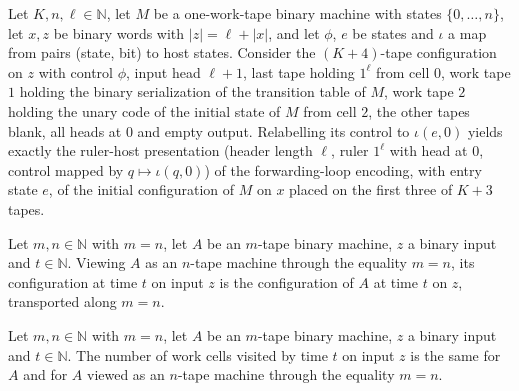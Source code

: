 \begin{theorem}
\label{Complexity.f6_last_ruler_layout}
\leanok
{}
Let $K,n,\ell\in\mathbb{N}$, let $M$ be a one-work-tape binary machine with states
$\{0,\dots,n\}$, let $x,z$ be binary words with $|z|=\ell+|x|$, and let $\phi$, $e$ be states and
$\iota$ a map from pairs (state, bit) to host states. Consider the $(K+4)$-tape configuration on
$z$ with control $\phi$, input head $\ell+1$, last tape holding $1^\ell$ from cell $0$, work tape
$1$ holding the binary serialization of the transition table of $M$, work tape $2$ holding the
unary code of the initial state of $M$ from cell $2$, the other tapes blank, all heads at $0$ and
empty output. Relabelling its control to $\iota(e,0)$ yields exactly the ruler-host presentation
(header length $\ell$, ruler $1^\ell$ with head at $0$, control mapped by $q\mapsto\iota(q,0)$)
of the forwarding-loop encoding, with entry state $e$, of the initial configuration of $M$ on $x$
placed on the first three of $K+3$ tapes.
\end{theorem}

\begin{theorem}
\label{Complexity.f6_cast_init_run}
\leanok
{}
Let $m,n\in\mathbb{N}$ with $m=n$, let $A$ be an $m$-tape binary machine, $z$ a binary input and
$t\in\mathbb{N}$. Viewing $A$ as an $n$-tape machine through the equality $m=n$, its configuration
at time $t$ on input $z$ is the configuration of $A$ at time $t$ on $z$, transported along $m=n$.
\end{theorem}

\begin{theorem}
\label{Complexity.f6_cast_init_space}
\leanok
{}
Let $m,n\in\mathbb{N}$ with $m=n$, let $A$ be an $m$-tape binary machine, $z$ a binary input and
$t\in\mathbb{N}$. The number of work cells visited by time $t$ on input $z$ is the same for $A$ and
for $A$ viewed as an $n$-tape machine through the equality $m=n$.
\end{theorem}

